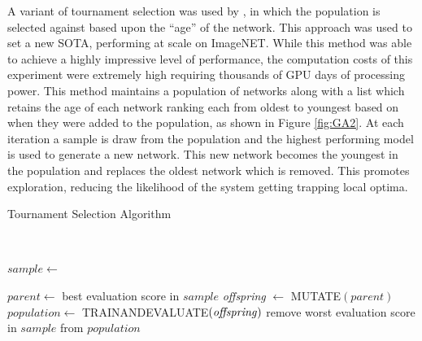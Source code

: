 \documentclass{article}
\begin{document}
	A variant of tournament selection was used by \cite{41}, in which the population is selected against based upon the “age” of the network.
	This approach was used to set a new SOTA, performing at scale on ImageNET.
	While this method was able to achieve a highly impressive level of performance, the computation costs of this experiment were extremely high requiring thousands of GPU days of processing power.
	This method maintains a population of networks along with a list which retains the age of each network ranking each from oldest to youngest based on when they were added to the population, as shown in Figure \ref{fig:GA2}.
	At each iteration a sample is draw from the population and the highest performing model is used to generate a new network. This new network becomes the youngest in the population and replaces the oldest network which is removed.
	This promotes exploration, reducing the likelihood of the system getting trapping local optima.  




	\begin{algorithm}[H]\label{alg:GA1}
		\caption{Tournament Selection Algorithm}

		\SetAlgoLined
		\
		

		{

			{
				$sample \leftarrow$ \;	
			
			}

			$parent \leftarrow$ best evaluation score in $sample$\;
			\textit{offspring} $\leftarrow$	MUTATE$(parent)$\;	
			$population \leftarrow$ TRAINANDEVALUATE$(\text{\textit{offspring}})$\;
			remove worst evaluation score in $sample$ from $population$\;

		}
		\;

		
	\end{algorithm}
\end{document}
